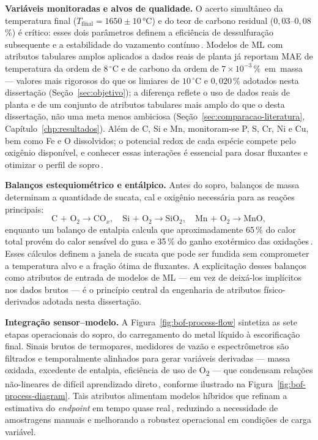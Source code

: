 \textbf{Variáveis monitoradas e alvos de qualidade.}
O acerto simultâneo da temperatura final ($T_\text{final}=1650\pm10$\,°C) e do teor de carbono residual ($0{,}03$–$0{,}08$\,\%) é crítico: esses dois parâmetros definem a eficiência de dessulfuração subsequente e a estabilidade do vazamento contínuo\,\cite{wang2020endpoint,diaz2019hotmetaltemp}. Modelos de ML com atributos tabulares amplos aplicados a dados reais de planta já reportam MAE de temperatura da ordem de $8\,^\circ\text{C}$ e de carbono da ordem de $7\times10^{-3}\,\%$~em~massa\,\cite{zhou2024bof} --- valores mais rigorosos do que os limiares de $10\,^\circ\text{C}$ e $0{,}020\,\%$ adotados nesta dissertação (Seção~\ref{sec:objetivo}); a diferença reflete o uso de dados reais de planta e de um conjunto de atributos tabulares mais amplo do que o desta dissertação, não uma meta menos ambiciosa (Seção~\ref{sec:comparacao-literatura}, Capítulo~\ref{chp:resultados}). Além de C, Si e Mn, monitoram-se P, S, Cr, Ni e Cu, bem como Fe e O dissolvidos; o potencial redox de cada espécie compete pelo oxigênio disponível, e conhecer essas interações é essencial para dosar fluxantes e otimizar o perfil de sopro\,\cite{bae2020bof}.

\textbf{Balanços estequiométrico e entálpico.}
Antes do sopro, balanços de massa determinam a quantidade de sucata, cal e oxigênio necessária para as reações principais:
\[
\text{C + O}_2 \rightarrow \text{CO}_x,\quad
\text{Si + O}_2 \rightarrow \text{SiO}_2,\quad
\text{Mn + O}_2 \rightarrow \text{MnO},
\]
enquanto um balanço de entalpia calcula que aproximadamente 65\,\% do calor total provém do calor sensível do gusa e 35\,\% do ganho exotérmico das oxidações\,\cite{madhavan2020heatbalance}. Esses cálculos definem a janela de sucata que pode ser fundida sem comprometer a temperatura alvo e a fração ótima de fluxantes. A explicitação desses balanços como atributos de entrada de modelos de ML — em vez de deixá-los implícitos nos dados brutos — é o princípio central da engenharia de atributos físico-derivados adotada nesta dissertação.

\textbf{Integração sensor–modelo.}
A Figura~\ref{fig:bof-process-flow} sintetiza as sete etapas operacionais do sopro, do carregamento do metal líquido à escorificação final. Sinais brutos de termopares, medidores de vazão e espectrômetros são filtrados e temporalmente alinhados para gerar variáveis derivadas — massa oxidada, excedente de entalpia, eficiência de uso de O\textsubscript{2} — que condensam relações não-lineares de difícil aprendizado direto\,\cite{willard2020integrating}, conforme ilustrado na Figura~\ref{fig:bof-process-diagram}. Tais atributos alimentam modelos híbridos que refinam a estimativa do \emph{endpoint} em tempo quase real\,\cite{chattopadhyay2022hybrid,xia2024dmpinn}, reduzindo a necessidade de amostragens manuais e melhorando a robustez operacional em condições de carga variável.

